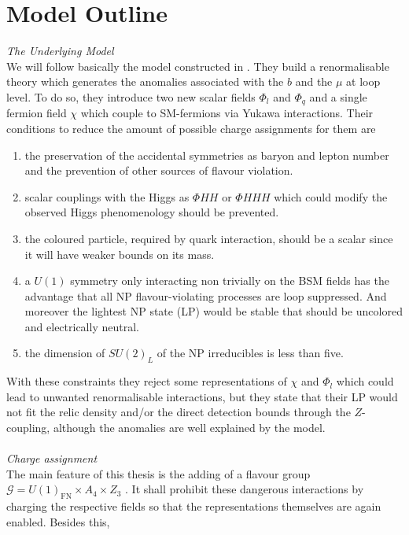 \section{Model Outline}
\textit{The Underlying Model}\\
\noindent We will follow basically the model constructed
in \cite{Grip}. They build a renormalisable theory which generates the anomalies associated with the $b$ and the $\mu$ at loop level. To do so, they 
introduce two new scalar fields $\Phi_l$ and $\Phi_q$ and a single fermion field $\chi$ which couple to SM-fermions via Yukawa interactions. 
Their conditions to reduce the amount of possible charge assignments for them are 
\begin{enumerate}
 \item the preservation of the accidental symmetries as baryon and lepton number and the prevention of other sources of flavour violation.
 \item scalar couplings with the Higgs as $\Phi H H$ or $\Phi H H H$ which could modify the observed Higgs phenomenology should be prevented.
 \item the coloured particle, required by quark interaction, should be a scalar since it will have weaker bounds on its mass.
 \item a $U(1)$ symmetry only interacting non trivially on the BSM fields has the advantage that all NP flavour-violating processes are loop suppressed. And
 moreover the lightest NP state (LP) would be stable that should be uncolored and electrically neutral. 
 \item the dimension of $SU(2)_L$ of the NP irreducibles is less than five.
\end{enumerate}
With these constraints they reject some representations of $\chi$ and $\Phi_l$ which could lead to unwanted renormalisable interactions, but they state 
that their LP would not fit the relic density and/or the direct detection bounds through the $Z$-coupling, although the anomalies are 
well explained by the model. \\ \\
\noindent \textit{Charge assignment}\\ \noindent
The main feature of this thesis is the adding of a flavour group $\mathcal{G} = U(1)_\text{FN}\times A_4 \times Z_3$ \cite{FerA4}\cite{VarzTotMod}. 
It shall prohibit these dangerous interactions by charging the respective fields so that the representations themselves are again enabled. Besides this,
